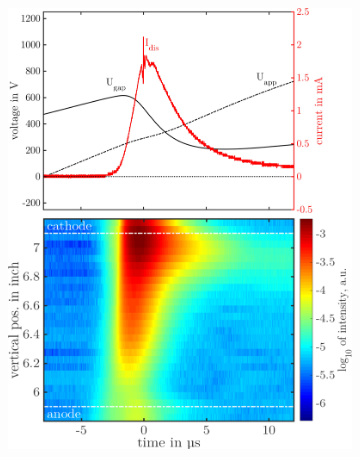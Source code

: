 \documentclass[a4paper,10pt,twoside]{article}
\begin{document}
		\onecolumn
				
				\begin{figure}
					\centering
					\begin{subfigure}[t]{0.5\textwidth}
						\includegraphics[width=\textwidth]{figures/706nm@sine/combination.pdf}
						\caption{}
						\label{img:combsine}
					\end{subfigure}
					\hfill
					\begin{subfigure}[t]{0.49\textwidth}

\end{subfigure}
\end{figure}
\end{document}

